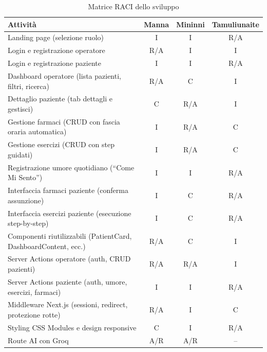 \begin{table}[H]
\centering
\renewcommand{\arraystretch}{1.25}
\footnotesize
\begin{tabularx}{\textwidth}{|X|c|c|c|}
\hline
\textbf{Attivit\`a} & \textbf{Manna} & \textbf{Mininni} & \textbf{Tamuliunaite} \\
\hline
Landing page (selezione ruolo) & I & I & R/A \\
\hline
Login e registrazione operatore & R/A & I & I \\
\hline
Login e registrazione paziente & I & I & R/A \\
\hline
Dashboard operatore (lista pazienti, filtri, ricerca) & R/A & C & I \\
\hline
Dettaglio paziente (tab dettagli e gestisci) & C & R/A & I \\
\hline
Gestione farmaci (CRUD con fascia oraria automatica) & I & R/A & C \\
\hline
Gestione esercizi (CRUD con step guidati) & I & R/A & C \\
\hline
Registrazione umore quotidiano (``Come Mi Sento'') & I & I & R/A \\
\hline
Interfaccia farmaci paziente (conferma assunzione) & I & C & R/A \\
\hline
Interfaccia esercizi paziente (esecuzione step-by-step) & I & C & R/A \\
\hline
Componenti riutilizzabili (PatientCard, DashboardContent, ecc.) & R/A & C & I \\
\hline
Server Actions operatore (auth, CRUD pazienti) & R/A & R/A & I \\
\hline
Server Actions paziente (auth, umore, esercizi, farmaci) & I & I & R/A \\
\hline
Middleware Next.js (sessioni, redirect, protezione rotte) & R/A & I & C \\
\hline
Styling CSS Modules e design responsive & C & I & R/A \\
\hline
Route AI con Groq & A/R & A/R & -- \\
\hline
\end{tabularx}
\caption{Matrice RACI dello sviluppo}
\label{tab:raci-sviluppo}
\end{table}

\newpage
